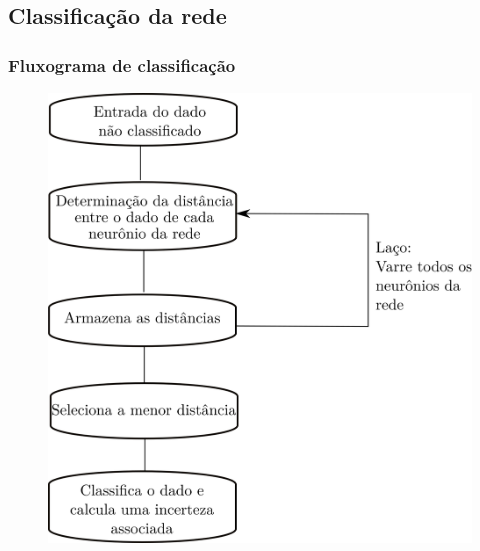 \documentclass[10pt]{beamer} %
\begin{document}
\subsection{Classificação da rede}
\begin{frame}
	\frametitle{Fluxograma de classificação}
	\begin{small}
		
		
		\begin{figure}[H]
			\centering
			
	
		\includegraphics[scale=0.55]{Imagens/classificacao.png}
		\end{figure}
	\end{small}
\end{frame}
\end{document}
